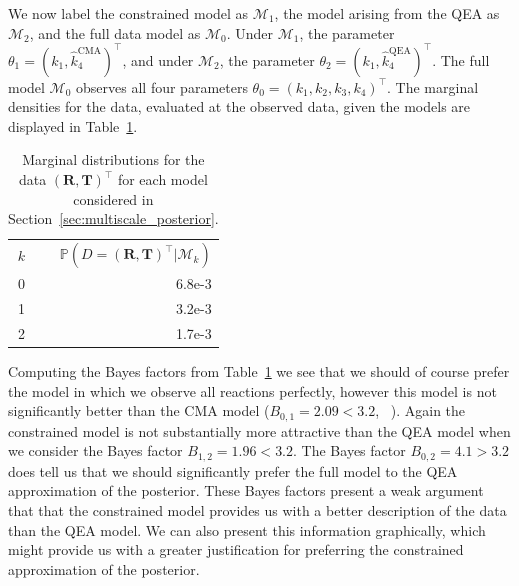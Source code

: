 \documentclass[final]{siamltex}
\begin{document}
We now label the constrained model as $\mathcal{M}_1$, the model arising from the QEA as $\mathcal{M}_2$, and the full data model as $\mathcal{M}_0$. Under $\mathcal{M}_1$, the parameter $\theta_1 = (k_1, \hat{k}_4^{\text{CMA}})^\top$, and under $\mathcal{M}_2$, the parameter $\theta_2 = (k_1, \hat{k}_4^{\text{QEA}})^\top$. The full model $\mathcal{M}_0$ observes all four parameters $\theta_0 = (k_1, k_2, k_3, k_4)^\top$. The marginal densities for the data, evaluated at the observed data, given the models are displayed in Table~\ref{tab:chem_Bayes_marginals}.

\begin{table}[!htb]
\centering
\begin{tabular}{rr}
	\toprule
	$k$ & \quad $\mathbb{P}(D = (\mathbf{R},\mathbf{T})^\top|\mathcal{M}_k)$ \\ \cmidrule(lr){1-2}
	0 & 6.8e-3 \\
	1 & 3.2e-3 \\
	2 & 1.7e-3 \\ \bottomrule
\end{tabular}
\caption{Marginal distributions for the data $(\mathbf{R},\mathbf{T})^\top$ for each model considered in Section~\ref{sec:multiscale_posterior}.}
\label{tab:chem_Bayes_marginals}
\end{table}

Computing the Bayes factors from Table~\ref{tab:chem_Bayes_marginals} we see that we should of course prefer the model in which we observe all reactions perfectly, however this model is not significantly better than the CMA model ($B_{0,1} = 2.09 < 3.2$, ~\cite{kass1995bayes}). Again the constrained model is not substantially more attractive than the QEA model when we consider the Bayes factor $B_{1,2} = 1.96 < 3.2$. The Bayes factor $B_{0,2} = 4.1 > 3.2$ does tell us that we should significantly prefer the full model to the QEA approximation of the posterior. These Bayes factors present a weak argument that that the constrained model provides us with a better description of the data than the QEA model. We can also present this information graphically, which might provide us with a greater justification for preferring the constrained approximation of the posterior.
\end{document}
